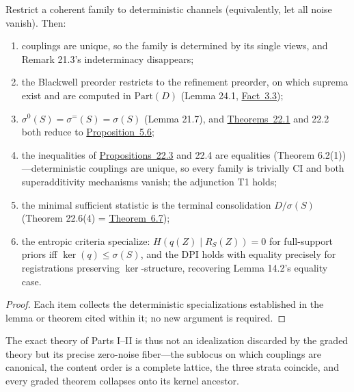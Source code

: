 \begin{thmplain}

Restrict a coherent family to deterministic channels (equivalently, let all noise vanish). Then:

\begin{enumerate}
\def\labelenumi{\arabic{enumi}.}
\tightlist
\item
  couplings are unique, so the family is determined by its single views, and Remark 21.3's indeterminacy disappears;
\item
  the Blackwell preorder restricts to the refinement preorder, on which suprema exist and are computed in \(\mathrm{Part}(D)\) (Lemma 24.1, \hyperlink{stmt:3.3}{Fact~3.3});
\item
  \(\sigma^{0}(S) = \sigma^{=}(S) = \sigma(S)\) (Lemma 21.7), and \hyperlink{stmt:22.1}{Theorems~22.1} and 22.2 both reduce to \hyperlink{stmt:5.6}{Proposition~5.6};
\item
  the inequalities of \hyperlink{stmt:22.3}{Propositions~22.3} and 22.4 are equalities (Theorem 6.2(1))---\hspace{0pt}deterministic couplings are unique, so every family is trivially CI and both superadditivity mechanisms vanish; the adjunction T1 holds;
\item
  the minimal sufficient statistic is the terminal consolidation \(D/\sigma(S)\) (Theorem 22.6(4) = \hyperlink{stmt:6.7}{Theorem~6.7});
\item
  the entropic criteria specialize: \(H(q(Z) \mid R_S(Z)) = 0\) for full-support priors iff \(\ker(q) \le \sigma(S)\), and the DPI holds with equality precisely for registrations preserving \(\ker\)-structure, recovering Lemma 14.2's equality case.
\end{enumerate}
\end{thmplain}

\begin{proof}

Each item collects the deterministic specializations established in the lemma or theorem cited within it; no new argument is required.
\end{proof}

The exact theory of Parts I--II is thus not an idealization discarded by the graded theory but its precise zero-noise fiber---\hspace{0pt}the sublocus on which couplings are canonical, the content order is a complete lattice, the three strata coincide, and every graded theorem collapses onto its kernel ancestor.

